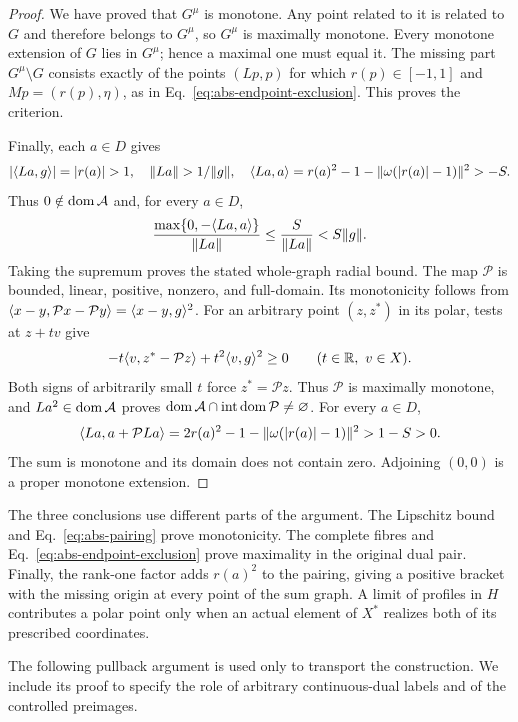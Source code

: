 \begin{proof}
We have proved that $G^\mu$ is monotone. Any point related to it
is related to $G$ and therefore belongs to $G^\mu$, so $G^\mu$
is maximally monotone. Every monotone extension of $G$ lies in
$G^\mu$; hence a maximal one must equal it. The missing part
$G^\mu\setminus G$ consists exactly of the points $(Lp,p)$ for which
$r(p)\in[-1,1]$ and $Mp=(r(p),\eta)$, as in
Eq.~\eqref{eq:abs-endpoint-exclusion}. This proves the criterion.

Finally, each $a\in D$ gives
\[
|\pair{La}{g}|=|r(a)|>1,\quad
\|La\|>1/\|g\|,\quad
\pair{La}{a}=r(a)^2-1-\|\omega(|r(a)|-1)\|^2>-S.
\]
Thus $0\notin\operatorname{dom}\mathcal A$ and, for every $a\in D$,
\[
\frac{\max\{0,-\langle La,a\rangle\}}{\|La\|}
\le\frac{S}{\|La\|}<S\|g\|.
\]
Taking the supremum proves the stated whole-graph radial bound.
The map $\mathcal P$ is bounded, linear, positive, nonzero, and full-domain.
Its monotonicity follows from
$\langle x-y,\mathcal Px-\mathcal Py\rangle=\langle x-y,g\rangle^2$.
For an arbitrary point $(z,z^*)$ in its polar, tests at $z+tv$ give
\[
-t\langle v,z^*-\mathcal Pz\rangle+t^2\langle v,g\rangle^2\ge0
\qquad(t\in\mathbb R,\ v\in X).
\]
Both signs of arbitrarily small $t$ force $z^*=\mathcal Pz$.
Thus $\mathcal P$ is maximally monotone, and $La^2\in\operatorname{dom}\mathcal A$
proves $\operatorname{dom}\mathcal A\cap\operatorname{int}\operatorname{dom}\mathcal P\ne\varnothing$.
For every $a\in D$,
\[
\langle La,a+\mathcal PLa\rangle
=2r(a)^2-1-\|\omega(|r(a)|-1)\|^2>1-S>0.
\]
The sum is monotone and its domain does not contain zero. Adjoining $(0,0)$
is a proper monotone extension.
\end{proof}

The three conclusions use different parts of the argument. The Lipschitz
bound and Eq.~\eqref{eq:abs-pairing} prove monotonicity. The complete
fibres and Eq.~\eqref{eq:abs-endpoint-exclusion} prove maximality in the
original dual pair. Finally, the rank-one factor adds $r(a)^2$ to the
pairing, giving a positive bracket with the missing origin at every point
of the sum graph. A limit of profiles in $H$ contributes a polar point only when an
actual element of $X^*$ realizes both of its prescribed coordinates.

The following pullback argument is used only to transport the construction.
We include its proof to specify the role of arbitrary continuous-dual
labels and of the controlled preimages.

